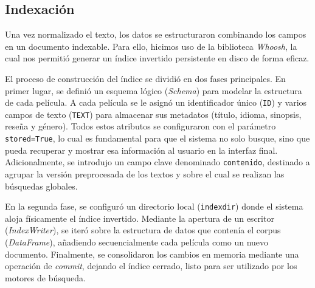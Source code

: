 \documentclass[conference,a4paper]{IEEEtran}
\begin{document}
\subsection{Indexación}

Una vez normalizado el texto, los datos se estructuraron combinando los campos en un documento indexable. Para ello, hicimos uso de la biblioteca \textit{Whoosh}, la cual nos permitió generar un índice invertido persistente en disco de forma eficaz. 

El proceso de construcción del índice se dividió en dos fases principales. En primer lugar, se definió un esquema lógico (\textit{Schema}) para modelar la estructura de cada película. A cada película se le asignó un identificador único (\texttt{ID}) y varios campos de texto (\texttt{TEXT}) para almacenar sus metadatos (título, idioma, sinopsis, reseña y género). Todos estos atributos se configuraron con el parámetro \texttt{stored=True}, lo cual es fundamental para que el sistema no solo busque, sino que pueda recuperar y mostrar esa información al usuario en la interfaz final. Adicionalmente, se introdujo un campo clave denominado \texttt{contenido}, destinado a agrupar la versión preprocesada de los textos y sobre el cual se realizan las búsquedas globales.

En la segunda fase, se configuró un directorio local (\texttt{indexdir}) donde el sistema aloja físicamente el índice invertido. Mediante la apertura de un escritor (\textit{IndexWriter}), se iteró sobre la estructura de datos que contenía el corpus (\textit{DataFrame}), añadiendo secuencialmente cada película como un nuevo documento. Finalmente, se consolidaron los cambios en memoria mediante una operación de \textit{commit}, dejando el índice cerrado,  listo para ser utilizado por los motores de búsqueda.
\end{document}
